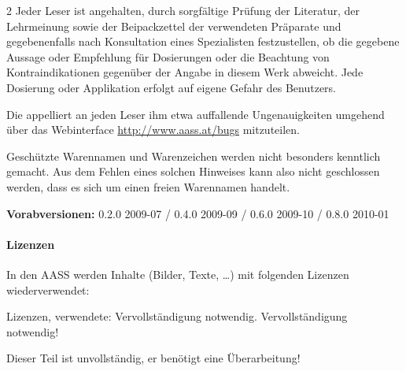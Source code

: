 \documentclass[
ngerman,
paper=a4,
asymmetric,
fontsize=9pt,
headings=small,
draft=false,
parskip=false,
footnotes=multiple,
]{scrbook}
\begin{document}
\begin{multicols}{2}
Jeder Leser ist angehalten, durch
sorg\-fältige Prü\-fung der Literatur, der Lehrmeinung so\-wie der
Beipackzettel der ver\-wendeten Präparate und gegebenenfalls nach
Konsultation eines Spezialisten fest\-zustellen, ob die gegebene
Aussage oder Empfehlung für Do\-sierungen oder die Beachtung von
Kon\-tra\-indi\-ka\-tionen gegenüber der Angabe in diesem
Werk abweicht. Jede Dosierung oder Ap\-pli\-kation erfolgt
auf eigene Gefahr des Be\-nutzers. 

Die {\ARGEAASS} appelliert an jeden Le\-ser ihm etwa auffallende Un\-ge\-nau\-igkei\-ten umgehend über
das Webinterface \url{http://www.aass.at/bugs} mitzuteilen.

Geschützte Waren\-namen und Wa\-ren\-zei\-chen werden nicht besonders
kenntlich ge\-macht. Aus dem Fehlen eines solchen Hin\-weises kann also
nicht ge\-schlossen werden, dass es sich um einen freien Waren\-namen
handelt.
\end{multicols}

{\scriptsize \textbf{Vorabversionen:} 0.2.0 2009-07 / 0.4.0 2009-09 / 0.6.0
2009-10 / 0.8.0 2010-01}

\paragraph{Lizenzen} In den AASS werden Inhalte (Bilder, Texte, \ldots) mit
folgenden Lizenzen wiederverwendet:
\begin{anfxerror}[author=GABS]{Lizenzen, verwendete: Vervollständigung
notwendig.} Vervollständigung notwendig! \par Dieser Teil ist unvollständig, 
   er benötigt eine Überarbeitung!
\end{anfxerror}
\end{document}

